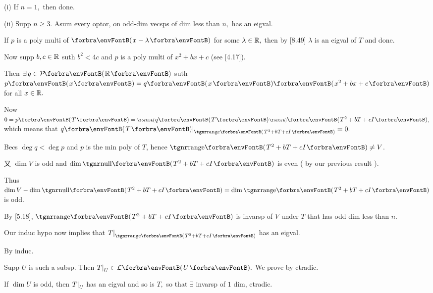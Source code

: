 \par\quad
(i) If $n=1,$ then done.\par\quad\Endi
(ii) Supp $n\geqslant 3.$ Asum every optor, on odd-dim vecsps of dim less than $n,$ has an eigval.\par\quad\Hii
If $p$ is a poly multi of $\Par{x - \lambda}$ for some $\lambda\in{\mathbb{R}},$ then by [8.49] $\lambda$ is an eigval of $T$ and done.\par\quad\Hii
Now supp $b, c\in{\mathbb{R}}$ suth $b^2 < 4c$ and $p$ is a poly multi of $x^2 + bx + c$ (see [4.17]).\par\quad\Hii
Then $\exists\,q\in\PoRi$ suth $p\Par{x} = q\Par{x}\Par{x^2 + bx + c}$ for all $x\in{\mathbb{R}}.$\par\quad\Hii
Now $0 = p\Par{T} = \BigPar{q\Par{T}}\Par{T^2 + bT + cI},$ which means that $q\Par{T}\mmid_{\Range\Par{T^2+bT+cI}}=0.$\par\quad\Hii
Becs $\deg q < \deg p$ and $p$ is the min poly of $T$, hence $\Range\Par{T^2 + bT + cI}\neq V$.\par\quad\Hii
又 $\dim V$ is odd and $\dim\Null\Par{T^2 +bT+cI}$ is even ( by our previous result ).\par\quad\Hii
Thus $\dim V - \dim \Null\Par{T^2 + bT + cI}=\dim \Range\Par{T^2 + bT + cI}$ is odd.\par\quad\Hii
By [5.18], $\Range\Par{T^2 + bT + cI}$ is invarsp of $V$ under $T$ that has odd dim less than $n.$\par\quad\Hii
Our induc hypo now implies that $T\mmid_{\Range\Par{T^2 + bT + cI}}$ has an eigval.\par\quad
By induc.\PfEnd
\SepLine

\par\quad
Supp $U$ is such a subsp. Then $T\mmid_U\in\Lm{U}.$
We prove by ctradic.\par\quad
If $\dim U$ is odd, then $T\text{\normalsize|}_U$ has an eigval and so is $T,$ so that $\exists$ invarsp of $1$ dim, ctradic.\PfEnd
\SepLine

